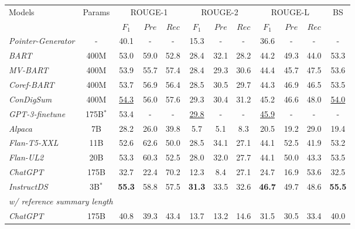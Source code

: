 \documentclass[11pt]{article}
\begin{document}
\begin{table*}[t]
        \centering
        \begin{adjustbox}{width=1.00\textwidth,center}
        \begin{tabular}{| l c | c  c  c | c  c  c | c  c  c | c | }
        \toprule
        
        \multirow{2}{*}{Models} & \multirow{2}{*}{Params} & \multicolumn{3}{c|}{ROUGE-1} & \multicolumn{3}{c|}{ROUGE-2} & \multicolumn{3}{c|}{ROUGE-L} & \multirow{2}{*}{BS} \\
        \cline{3-11}
         & & $F_1$ & $Pre$ & $Rec$ & $F_1$ & $Pre$ & $Rec$ & $F_1$ & $Pre$ & $Rec$ &  \\
        \hline
        \emph{Pointer-Generator} & - & 40.1 & - & - & 15.3 & - & - & 36.6 & - & - & - \\
        \emph{BART} & 400M & 53.0 & 59.0 & 52.8 & 28.4 & 32.1 & 28.2 & 44.2 & 49.3 & 44.0 & 53.3 \\
        \emph{MV-BART} & 400M & 53.9 & 55.7 & 57.4 & 28.4 & 29.3 & 30.6 & 44.4 & 45.7 & 47.5 & 53.6 \\
        \emph{Coref-BART} & 400M & 53.7 & 56.9 & 56.4 & 28.5 & 30.5 & 29.7 & 44.3 & 46.9 & 46.5 & 53.5 \\
        \emph{ConDigSum} & 400M & \underline{54.3} & 56.0 & 57.6 & 29.3 & 30.4 & 31.2 & 45.2 & 46.6 & 48.0 & \underline{54.0} \\
        \emph{GPT-3-finetune} & 175B$^*$ & 53.4 & - & - & \underline{29.8} & - & - & \underline{45.9} & - & - & -\\
        \hline
        \emph{Alpaca} & 7B & 28.2 & 26.0 & 39.8 & 5.7 & 5.1 & 8.3 & 20.5 & 19.2 & 29.0 & 19.4 \\
        \emph{Flan-T5-XXL} & 11B & 52.6 & 62.6 & 50.0 & 28.5 & 34.1 & 27.1 & 44.1 & 52.5 & 41.9 & 53.2 \\
        \emph{Flan-UL2} & 20B & 53.3 & 60.3 & 52.5 & 28.0 & 32.0 & 27.7 & 44.1 & 50.0 & 43.3 & 53.5 \\
        \emph{ChatGPT} & 175B & 32.7 & 22.4 & 70.2 & 12.3 & 8.4 & 27.1 & 24.7 & 16.9 & 53.6 & 32.5 \\
        \hline
        \emph{InstructDS} & 3B$^*$ & \textbf{55.3} & 58.8 & 57.5 & \textbf{31.3} & 33.5 & 32.6 & \textbf{46.7} & 49.7 & 48.6 & \textbf{55.5} \\ \hline \hline 
        \multicolumn{12}{|l|}{\emph{w/ reference summary length}}\\\hline
        \emph{ChatGPT} & 175B & 40.8 & 39.3 & 43.4 & 13.7 & 13.2 & 14.6 & 31.5 & 30.5 & 33.4 & 40.0 \\

\end{tabular}
\end{adjustbox}
\end{table*}
\end{document}

